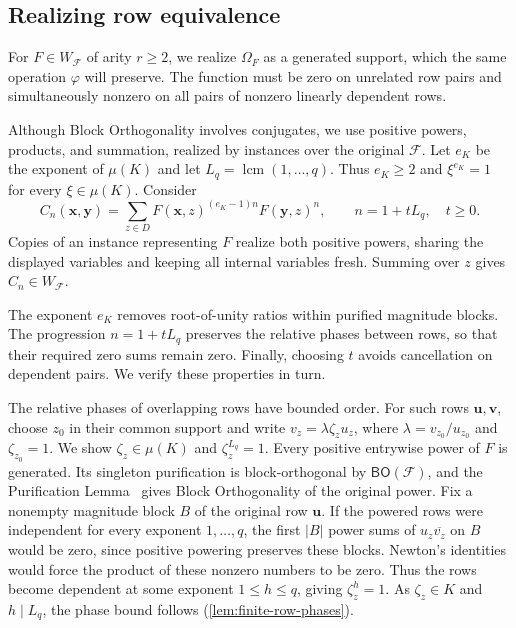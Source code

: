 \documentclass[11pt,letterpaper,onecolumn]{article}
\theoremstyle{plain}
\theoremstyle{definition}
\theoremstyle{remark}
\newcommand{\cF}{\mathcal F}
\newcommand{\BO}{\mathsf{BO}}
\newcommand{\RowEq}[1]{\Omega_{#1}}
\DeclareMathOperator{\lcm}{lcm}
\begin{document}
\subsection{Realizing row equivalence}

For $F\in W_{\cF}$ of arity $r\ge2$, we realize $\RowEq F$ as a
generated support, which the same operation $\varphi$ will preserve.
The function must be zero on unrelated row pairs and simultaneously
nonzero on all pairs of nonzero linearly dependent rows.

Although Block Orthogonality involves conjugates, we use positive powers,
products, and summation, realized by instances over the original $\cF$.
Let $e_K$ be the exponent of $\mu(K)$ and
let $L_q=\lcm(1,\ldots,q)$. Thus $e_K\ge2$ and
$\xi^{e_K}=1$ for every $\xi\in\mu(K)$.
Consider
\begin{equation}
 C_n(\mathbf x,\mathbf y)
 =\sum_{z\in D}F(\mathbf x,z)^{(e_K-1)n}F(\mathbf y,z)^n,
 \qquad n=1+tL_q,\quad t\ge0.
 \label{s:eq:detector}
\end{equation}
Copies of an instance representing $F$ realize both positive powers,
sharing the displayed variables and keeping all internal variables
fresh. Summing over $z$ gives $C_n\in W_{\cF}$.

The exponent $e_K$ removes root-of-unity ratios within purified
magnitude blocks. The progression $n=1+tL_q$ preserves the relative
phases between rows, so that their required zero sums remain zero.
Finally, choosing $t$ avoids cancellation on dependent pairs.
We verify these properties in turn.

The relative phases of overlapping rows have bounded order. For such
rows $\mathbf u,\mathbf v$, choose $z_0$ in their common support and write
$v_z=\lambda\zeta_zu_z$, where $\lambda=v_{z_0}/u_{z_0}$ and
$\zeta_{z_0}=1$. We show $\zeta_z\in\mu(K)$ and $\zeta_z^{L_q}=1$.
Every positive entrywise power of $F$ is generated. Its singleton
purification is block-orthogonal by $\BO(\cF)$, and the Purification
Lemma~\cite[Lemma~7 and Corollary~1]{CaiChen2017} gives Block Orthogonality
of the original power. Fix a nonempty magnitude block $B$ of the
original row $\mathbf u$. If the powered rows were independent for every
exponent $1,\ldots,q$, the first $|B|$ power sums of $u_z\overline{v_z}$
on $B$ would be zero, since positive powering preserves these blocks.
Newton's identities would force the product of these nonzero numbers
to be zero. Thus the rows become dependent at some exponent
$1\le h\le q$, giving $\zeta_z^h=1$. As $\zeta_z\in K$ and
$h\mid L_q$, the phase bound follows (\cref{lem:finite-row-phases}).
\end{document}

